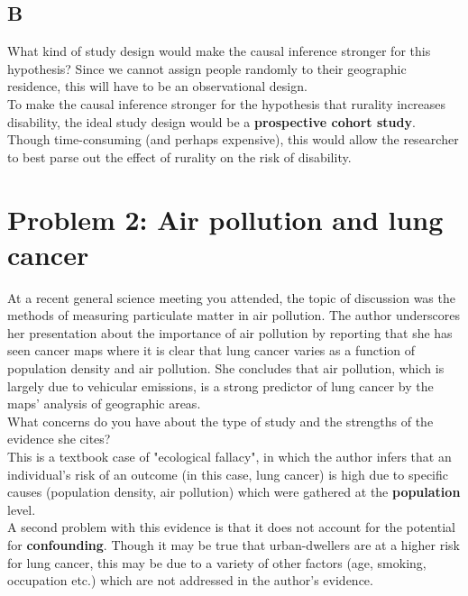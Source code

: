 \documentclass[12pt]{article}
\begin{document}
\subsection*{B}
\textcolor{black!50}{What kind of study design would make the causal inference stronger for this hypothesis?  Since we cannot assign people randomly to their geographic residence, this will have to be an observational design.} \\


\noindent To make the causal inference stronger for the hypothesis that rurality increases disability, the ideal study design would be a \textbf{prospective cohort study}.  Though time-consuming (and perhaps expensive), this would allow the researcher to best parse out the effect of rurality on the risk of disability.

\section*{Problem 2: Air pollution and lung cancer}

\textcolor{black!50}{At a recent general science meeting you attended, the topic of discussion was the methods of measuring particulate matter in air pollution.  The author underscores her presentation about the importance of air pollution by reporting that she has seen cancer maps where it is clear that lung cancer varies as a function of population density and air pollution.  She concludes that air pollution, which is largely due to vehicular emissions, is a strong predictor of lung cancer by the maps' analysis of geographic areas.}  \\

\noindent\textcolor{black!50}{What concerns do you have about the type of study and the strengths of the evidence she cites?}\\



\noindent This is a textbook case of "ecological fallacy", in which the author infers that an individual's risk of an outcome (in this case, lung cancer) is high due to specific causes (population density, air pollution) which were gathered at the \textbf{population} level.  \\

\noindent A second problem with this evidence is that it does not account for the potential for \textbf{confounding}.  Though it may be true that urban-dwellers are at a higher risk for lung cancer, this may be due to a variety of other factors (age, smoking, occupation  etc.) which are not addressed in the author's evidence. 
\end{document}
